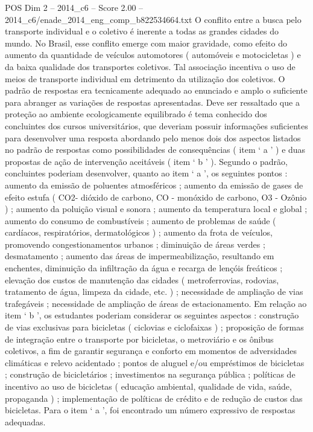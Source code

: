 \begin{textsample}{POS Dim 2 – 2014\_c6 – Score 2.00 – 2014\_c6/enade\_2014\_eng\_comp\_b822534664.txt}
O conflito entre a busca pelo transporte individual e o coletivo é inerente a todas as grandes cidades do mundo.
No Brasil, esse conflito emerge com maior gravidade, como efeito do aumento da quantidade de veículos automotores ( automóveis e motocicletas ) e da baixa qualidade dos transportes coletivos.
Tal associação incentiva o uso de meios de transporte individual em detrimento da utilização dos coletivos.
O padrão de respostas era tecnicamente adequado ao enunciado e amplo o suficiente para abranger as variações de respostas apresentadas.
Deve ser ressaltado que a proteção ao ambiente ecologicamente equilibrado é tema conhecido dos concluintes dos cursos universitários, que deveriam possuir informações suficientes para desenvolver uma resposta abordando pelo menos dois dos aspectos listados no padrão de respostas como possibilidades de consequências ( item ‘ a ’ ) e duas propostas de ação de intervenção aceitáveis ( item ‘ b ’ ).
Segundo o padrão, concluintes poderiam desenvolver, quanto ao item ‘ a ’, os seguintes pontos : aumento da emissão de poluentes atmosféricos ; aumento da emissão de gases de efeito estufa ( CO2- dióxido de carbono, CO - monóxido de carbono, O3 - Ozônio ) ; aumento da poluição visual e sonora ; aumento da temperatura local e global ; aumento do consumo de combustíveis ; aumento de problemas de saúde ( cardíacos, respiratórios, dermatológicos ) ; aumento da frota de veículos, promovendo congestionamentos urbanos ; diminuição de áreas verdes ; desmatamento ; aumento das áreas de impermeabilização, resultando em enchentes, diminuição da infiltração da água e recarga de lençóis freáticos ; elevação dos custos de manutenção das cidades ( metroferrovias, rodovias, tratamento de água, limpeza da cidade, etc. ) ; necessidade de ampliação de vias trafegáveis ; necessidade de ampliação de áreas de estacionamento.
Em relação ao item ‘ b ’, os estudantes poderiam considerar os seguintes aspectos : construção de vias exclusivas para bicicletas ( ciclovias e ciclofaixas ) ; proposição de formas de integração entre o transporte por bicicletas, o metroviário e os ônibus coletivos, a fim de garantir segurança e conforto em momentos de adversidades climáticas e relevo acidentado ; pontos de aluguel e/ou empréstimos de bicicletas ; construção de bicicletários ; investimentos na segurança pública ; políticas de incentivo ao uso de bicicletas ( educação ambiental, qualidade de vida, saúde, propaganda ) ; implementação de políticas de crédito e de redução de custos das bicicletas.
Para o item ‘ a ’, foi encontrado um número expressivo de respostas adequadas.

\end{textsample}

